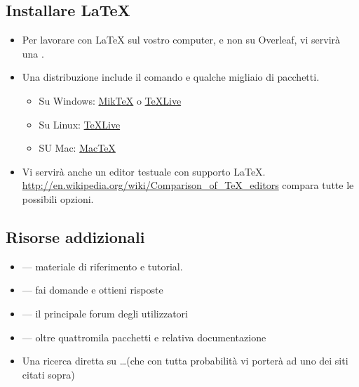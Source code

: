 \documentclass{beamer}
\begin{document}
\subsection{Installare \LaTeX{}}
\begin{frame}{\insertsubsection}
\begin{itemize}
\item Per lavorare con \LaTeX{} sul vostro computer, e non su Overleaf, vi servir\`a una .
\item Una distribuzione include il comando  
e qualche migliaio di pacchetti.
\begin{itemize}
\item Su Windows: \href{http://miktex.org/}{Mik\TeX} o \href{http://tug.org/texlive/}{\TeX Live}
\item Su Linux: \href{http://tug.org/texlive/}{\TeX Live}
\item SU Mac: \href{http://tug.org/mactex/}{Mac\TeX}
\end{itemize}
\item Vi servir\`a anche un editor testuale con supporto \LaTeX{}. \small{\url{http://en.wikipedia.org/wiki/Comparison_of_TeX_editors}} compara tutte le possibili opzioni.
\end{itemize}
\end{frame}

\subsection{Risorse addizionali}
\begin{frame}{\insertsubsection}
\begin{itemize}
\item {} ---
materiale di riferimento e tutorial.
\item{} --- fai domande e ottieni risposte
\item {} --- il principale forum degli utilizzatori
\item {} ---
oltre quattromila pacchetti e relativa documentazione
\item Una ricerca diretta su \ldots (che con tutta probabilit\`a vi porter\`a ad uno dei siti citati sopra)
\end{itemize}
\end{frame}
\end{document}
